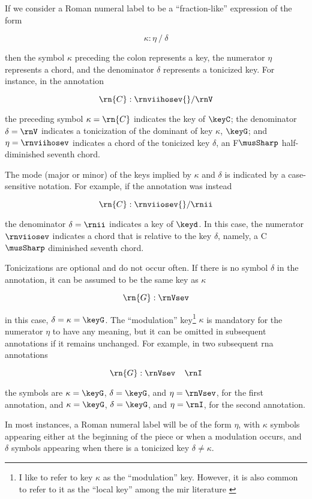 
If we consider a Roman numeral label to be a
``fraction-like'' expression of the form

\begin{equation}
    \kappa : \eta \: / \: \delta
\end{equation}

then the symbol $\kappa$ preceding the colon represents a
key, the numerator $\eta$ represents a chord, and the
denominator $\delta$ represents a tonicized key. For
instance, in the annotation 

\begin{equation}
    \rn{C}:\rnviihosev{}/\rnV
\end{equation}

the preceding symbol $\kappa=\rn{C}$ indicates the key of
$\keyC$; the denominator $\delta = \rnV$ indicates a
tonicization of the dominant of key $\kappa$, $\keyG$; and
$\eta=\rnviihosev$ indicates a chord of the tonicized key
$\delta$, an F$\musSharp$ half-diminished seventh chord.

The mode (major or minor) of the keys implied by $\kappa$
and $\delta$ is indicated by a case-sensitive notation. For
example, if the annotation was instead

\begin{equation}
    \rn{C}:\rnviiosev{}/\rnii
\end{equation}

the denominator $\delta=\rnii$ indicates a key of $\keyd$.
In this case, the numerator $\rnviiosev$ indicates a chord
that is relative to the key $\delta$, namely, a C$\musSharp$
diminished seventh chord.

Tonicizations are optional and do not occur often. If there
is no symbol $\delta$ in the annotation, it can be assumed
to be the same key as $\kappa$

\begin{equation}
    \rn{G}:\rnVsev
\end{equation}

in this case, $\delta = \kappa = \keyG$. The ``modulation''
key\footnote{I like to refer to key $\kappa$ as the
``modulation'' key. However, it is also common to refer to
it as the ``local key'' among the \gls{mir} literature
\parencite{napoleslopez2020local}} $\kappa$ is mandatory for
the numerator $\eta$ to have any meaning, but it can be
omitted in subsequent annotations if it remains unchanged.
For example, in two subsequent \gls{rna} annotations

\begin{equation}
    \rn{G}:\rnVsev \;\;\;\; \rnI
\end{equation}

the symbols are $\kappa=\keyG$, $\delta=\keyG$, and
$\eta=\rnVsev$, for the first annotation, and
$\kappa=\keyG$, $\delta=\keyG$, and $\eta=\rnI$, for the
second annotation.

In most instances, a Roman numeral label will be of the form
$\eta$, with $\kappa$ symbols appearing either at the
beginning of the piece or when a modulation occurs, and
$\delta$ symbols appearing when there is a tonicized key
$\delta \neq \kappa$.
